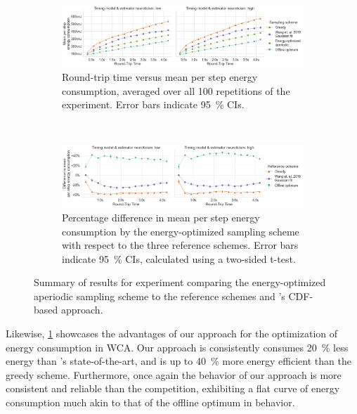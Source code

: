 \begin{figure}
    \centering
    \begin{subfigure}[t]{\textwidth}
        \centering
        \includegraphics[width=\textwidth]{figs/new_model/energy_optimization.png}
        \caption{%
            Round-trip time versus mean per step energy consumption, averaged over all \num{100} repetitions of the experiment.
            Error bars indicate \SI{95}{\percent} \glspl{CI}.
        }
    \end{subfigure}\\
    \medskip
    \begin{subfigure}[t]{\textwidth}
        \centering
        \includegraphics[width=\textwidth]{figs/new_model/energy_optimization_diff.png}
        \caption{%
            Percentage difference in mean per step energy consumption by the energy-optimized sampling scheme with respect to the three reference schemes.
            Error bars indicate \SI{95}{\percent} \glspl{CI}, calculated using a two-sided t-test.
        }
    \end{subfigure}
    \caption{%
        Summary of results for experiment comparing the energy-optimized aperiodic sampling scheme to the reference schemes and \textcite{wang2019towards}'s \gls{CDF}-based approach.
    }\label{fig:optimization:energy}
\end{figure}

Likewise, \cref{fig:optimization:energy} showcases the advantages of our approach for the optimization of energy consumption in \gls{WCA}.
Our approach is consistently consumes \SI{20}{\percent} less energy than \textcite{wang2019towards}'s state-of-the-art, and is up to \SI{40}{\percent} more energy efficient than the greedy scheme.
Furthermore, once again the behavior of our approach is more consistent and reliable than the competition, exhibiting a flat curve of energy consumption much akin to that of the offline optimum in behavior.

